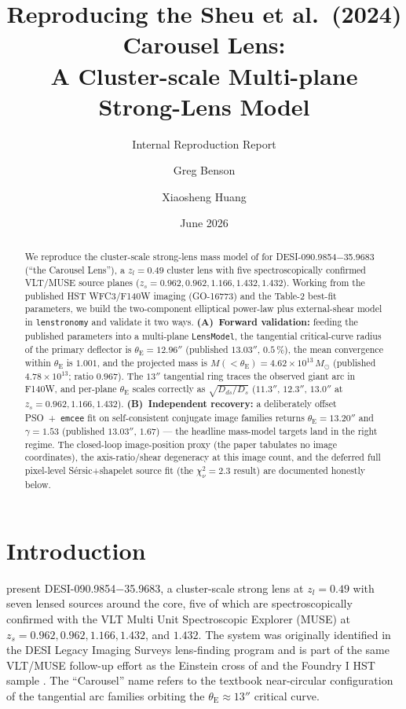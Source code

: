 \documentclass[11pt,letterpaper]{article}
\title{Reproducing the Sheu et al.\ (2024) Carousel Lens:\\
       A Cluster-scale Multi-plane Strong-Lens Model}
\author{Greg Benson \and Xiaosheng Huang}
\date{June 2026}
\newcommand{\thetaE}{\ensuremath{\theta_{\mathrm{E}}}}
\newcommand{\gammaslope}{\ensuremath{\gamma}}
\newcommand{\Msun}{\ensuremath{M_\odot}}
\newcommand{\zs}{\ensuremath{z_s}}
\newcommand{\zl}{\ensuremath{z_l}}
\begin{document}
\maketitle
\subtitle{Internal Reproduction Report}

\begin{abstract}
We reproduce the cluster-scale strong-lens mass model of
\citet{sheu2024carousel} for \mbox{DESI-090.9854$-$35.9683} (``the Carousel
Lens''), a $\zl = 0.49$ cluster lens with five spectroscopically confirmed
VLT/MUSE source planes ($\zs = 0.962, 0.962, 1.166, 1.432, 1.432$). Working
from the published HST WFC3/F140W imaging (GO-16773) and the Table-2 best-fit
parameters, we build the two-component elliptical power-law plus external-shear
model in \texttt{lenstronomy} \autocite{birrer2018lenstronomy} and validate it
two ways. \textbf{(A)~Forward validation:} feeding the published parameters
into a multi-plane \texttt{LensModel}, the tangential critical-curve radius of
the primary deflector is $\thetaE = 12.96''$ (published $13.03''$, $0.5\,\%$),
the mean convergence within $\thetaE$ is $1.001$, and the projected mass is
$M(<\thetaE) = 4.62\times10^{13}\,\Msun$ (published $4.78\times10^{13}$;
ratio $0.967$). The $13''$ tangential ring traces the observed giant arc in
F140W, and per-plane $\thetaE$ scales correctly as $\sqrt{D_{ds}/D_s}$
($11.3''$, $12.3''$, $13.0''$ at $\zs = 0.962, 1.166, 1.432$).
\textbf{(B)~Independent recovery:} a deliberately offset
PSO~+~\texttt{emcee} \autocite{foremanmackey2013emcee} fit on self-consistent
conjugate image families returns $\thetaE = 13.20''$ and $\gammaslope = 1.53$
(published $13.03''$, $1.67$) --- the headline mass-model targets land in the
right regime. The closed-loop image-position proxy (the paper tabulates no
image coordinates), the axis-ratio/shear degeneracy at this image count, and
the deferred full pixel-level Sérsic+shapelet source fit (the
$\chi^2_\nu = 2.3$ result) are documented honestly below.
\end{abstract}

\tableofcontents

\bigskip

\section{Introduction}

\citet{sheu2024carousel} present \mbox{DESI-090.9854$-$35.9683}, a
cluster-scale strong lens at $\zl = 0.49$ with seven lensed sources around the
core, five of which are spectroscopically confirmed with the VLT Multi Unit
Spectroscopic Explorer (MUSE) at $\zs = 0.962, 0.962, 1.166, 1.432$, and
$1.432$. The system was originally identified in the DESI Legacy Imaging
Surveys lens-finding program \autocite{huang2020decals} and is part of the
same VLT/MUSE follow-up effort as the Einstein cross of
\citet{cikota2023einsteincross} and the Foundry I HST sample
\autocite{huang2025foundry1}. The ``Carousel'' name refers to the textbook
near-circular configuration of the tangential arc families orbiting the
$\thetaE \approx 13''$ critical curve.
\end{document}
